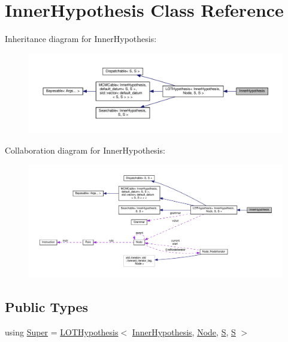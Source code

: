 \hypertarget{class_inner_hypothesis}{}\section{Inner\+Hypothesis Class Reference}
\label{class_inner_hypothesis}


Inheritance diagram for Inner\+Hypothesis\+:\nopagebreak
\begin{figure}[H]
\begin{center}
\leavevmode
\includegraphics[width=350pt]{class_inner_hypothesis__inherit__graph}
\end{center}
\end{figure}


Collaboration diagram for Inner\+Hypothesis\+:\nopagebreak
\begin{figure}[H]
\begin{center}
\leavevmode
\includegraphics[width=350pt]{class_inner_hypothesis__coll__graph}
\end{center}
\end{figure}
\subsection*{Public Types}
\begin{DoxyCompactItemize}
\item 
using \hyperlink{class_inner_hypothesis_a2c15665b923d905f1f7441282780abc2}{Super} = \hyperlink{class_l_o_t_hypothesis}{L\+O\+T\+Hypothesis}$<$ \hyperlink{class_inner_hypothesis}{Inner\+Hypothesis}, \hyperlink{class_node}{Node}, \hyperlink{_formal_language_theory-_complex_2_main_8cpp_a51c40915539205f0b5add30b0d68a4cb}{S}, \hyperlink{_formal_language_theory-_complex_2_main_8cpp_a51c40915539205f0b5add30b0d68a4cb}{S} $>$
\end{DoxyCompactItemize}
